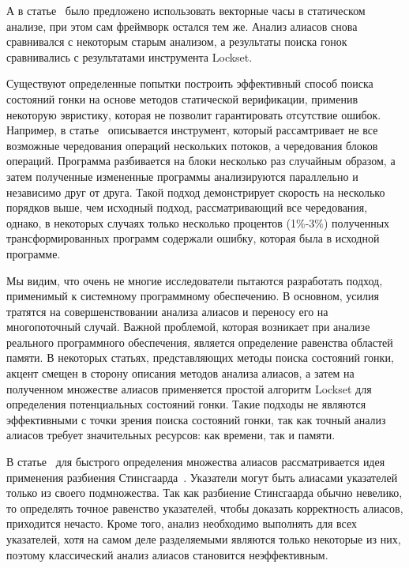 А в статье~\cite{Zhou:2018} было предложено использовать векторные часы в статическом анализе, при этом сам фреймворк остался тем же.
Анализ алиасов снова сравнивался с некоторым старым анализом, а результаты поиска гонок сравнивались с результатами инструмента Lockset.

Существуют определенные попытки построить эффективный способ поиска состояний гонки на основе методов статической верификации, применив некоторую эвристику, которая не позволит гарантировать отсутствие ошибок.
Например, в статье~\cite{VerySMART} описывается инструмент, который рассамтривает не все возможные чередования операций нескольких потоков, а чередования блоков операций. 
Программа разбивается на блоки несколько раз случайным образом, а затем полученные измененные программы анализируются параллельно и независимо друг от друга.
Такой подход демонстрирует скорость на несколько порядков выше, чем исходный подход, рассматривающий все чередования, однако, в некоторых случаях только несколько процентов (1\%-3\%) полученных трансформированных программ содержали ошибку, которая была в исходной программе. 


Мы видим, что очень не многие исследователи пытаются разработать подход, применимый к системному программному обеспечению. 
В основном, усилия тратятся на совершенствовании анализа алиасов и переносу его на многопоточный случай.
Важной проблемой, которая возникает при анализе реального программного обеспечения, является определение равенства областей памяти.
В некоторых статьях, представляющих методы поиска состояний гонки, акцент смещен в сторону описания методов анализа алиасов, а затем на полученном множестве алиасов применяется простой алгоритм Lockset для определения потенциальных состояний гонки. 
Такие подходы не являются эффективными с точки зрения поиска состояний гонки, так как точный анализ алиасов требует значительных ресурсов: как времени, так и памяти.

В статье~\cite{Kahlon:2009:SDR} для быстрого определения множества алиасов рассматривается идея применения разбиения Стинсгаарда~\cite{Steensgaard:1996}. 
Указатели могут быть алиасами указателей только из своего подмножества.
Так как разбиение Стинсгаарда обычно невелико, то определять точное равенство указателей, чтобы доказать корректность алиасов, приходится нечасто.
Кроме того, анализ необходимо выполнять для всех указателей, хотя на самом деле разделяемыми являются только некоторые из них, поэтому классический анализ алиасов становится неэффективным.

